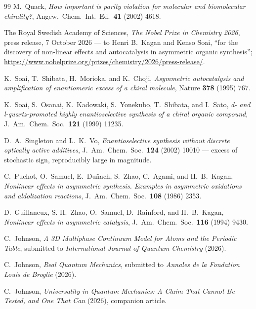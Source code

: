 \documentclass[11pt]{article}
\begin{document}
\begin{thebibliography}{99}
 M.~Quack, \emph{How important is parity violation for molecular and
  biomolecular chirality?}, Angew.\ Chem.\ Int.\ Ed.\ \textbf{41} (2002) 4618.

 The Royal Swedish Academy of Sciences, \emph{The Nobel Prize in Chemistry
  2026}, press release, 7 October 2026 --- to Henri B.~Kagan and Kenso Soai, ``for the discovery
  of non-linear effects and autocatalysis in asymmetric organic synthesis'';
  \url{https://www.nobelprize.org/prizes/chemistry/2026/press-release/}.

 K.~Soai, T.~Shibata, H.~Morioka, and K.~Choji, \emph{Asymmetric autocatalysis
  and amplification of enantiomeric excess of a chiral molecule}, Nature \textbf{378} (1995) 767.

 K.~Soai, S.~Osanai, K.~Kadowaki, S.~Yonekubo, T.~Shibata, and I.~Sato,
  \emph{d- and l-quartz-promoted highly enantioselective synthesis of a chiral organic compound},
  J.~Am.~Chem.~Soc.\ \textbf{121} (1999) 11235.

 D.~A.~Singleton and L.~K.~Vo, \emph{Enantioselective synthesis without
  discrete optically active additives}, J.~Am.~Chem.~Soc.\ \textbf{124} (2002) 10010 --- excess of
  stochastic sign, reproducibly large in magnitude.

 C.~Puchot, O.~Samuel, E.~Du\~nach, S.~Zhao, C.~Agami, and H.~B.~Kagan,
  \emph{Nonlinear effects in asymmetric synthesis. Examples in asymmetric oxidations and
  aldolization reactions}, J.~Am.~Chem.~Soc.\ \textbf{108} (1986) 2353.

 D.~Guillaneux, S.-H.~Zhao, O.~Samuel, D.~Rainford, and H.~B.~Kagan,
  \emph{Nonlinear effects in asymmetric catalysis}, J.~Am.~Chem.~Soc.\ \textbf{116} (1994) 9430.

 C.~Johnson, \emph{A 3D Multiphase Continuum Model for Atoms and the
  Periodic Table}, submitted to \emph{International Journal of Quantum Chemistry} (2026).

 C.~Johnson, \emph{Real Quantum Mechanics}, submitted to
  \emph{Annales de la Fondation Louis de Broglie} (2026).

 C.~Johnson, \emph{Universality in Quantum Mechanics: A Claim That
  Cannot Be Tested, and One That Can} (2026), companion article.

\end{thebibliography}
\end{document}
